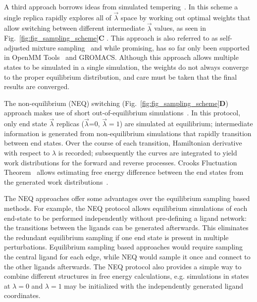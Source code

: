 \documentclass[9pt,bestpractices]{livecoms}
\begin{document}
A third approach borrows ideas from simulated tempering~\cite{marinari1992simulated}. In this scheme a single replica rapidly explores all of $\vec{\lambda}$ space by working out optimal weights that allow switching between different intermediate $\vec{\lambda}$ values, as seen in Fig.~\ref{fig:fig_sampling_scheme}\textbf{C} . This approach is also referred to as self-adjusted mixture sampling~\cite{lyubartsev1992new, li2007simulated, tan2017optimally} and while promising, has so far only been supported in OpenMM Tools~\cite{andrearizzi2019choderalab} and GROMACS.  Although this approach allows multiple states to be simulated in a single simulation, the weights do not always converge to the proper equilibrium distribution, and care must be taken that the final results are converged. 

The non-equilibrium (NEQ) switching (Fig.~\ref{fig:fig_sampling_scheme}\textbf{D}) approach makes use of short out-of-equilibrium simulations~\cite{aldeghi2018accurate}. In this protocol, only end state $\vec{\lambda}$ replicas ($\vec{\lambda}$=0, $\vec{\lambda}=1$) are simulated at equilibrium; intermediate information is generated from non-equilibrium simulations that rapidly transition between end states. 
Over the course of each transition, Hamiltonian derivative with respect to $\lambda$ is recorded; subsequently the curves are integrated to yield work distributions for the forward and reverse processes. Crooks Fluctuation Theorem~\cite{crooks1999entropy} allows estimating free energy difference between the end states from the generated work distributions~\cite{shirts2003equilibrium}.

The NEQ approaches offer some advantages over the equilibrium sampling based methods. For example, the NEQ protocol allows equilibrium simulations of each end-state to be performed independently without pre-defining a ligand network: the transitions between the ligands can be generated afterwards. This eliminates the redundant equilibrium sampling if one end state is present in multiple perturbations. Equilibrium sampling based approaches would require sampling the central ligand for each edge, while NEQ would sample it once and connect to the other ligands afterwards. The NEQ protocol also provides a simple way to combine different structures in free energy calculations, e.g. simulations in states at $\lambda=0$ and $\lambda=1$ may be initialized with the independently generated ligand coordinates. 

\end{document}
